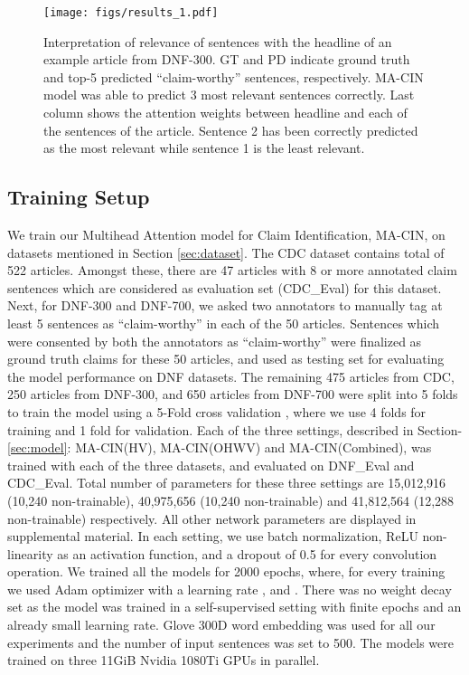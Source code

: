 \documentclass[11pt,a4paper]{article}
\begin{document}
\begin{figure*}[ht]
\begin{center}
\texttt{[image: figs/results\_1.pdf]}
\caption{\label{fig:hd_sent} Interpretation of relevance of sentences with the headline of an example article from DNF-300. GT and PD indicate ground truth and top-5 predicted ``claim-worthy'' sentences, respectively. MA-CIN model was able to predict 3 most relevant sentences correctly. Last column shows the attention weights between headline and each of the sentences of the article. Sentence 2 has been correctly predicted as the most relevant while sentence 1 is the least relevant.}
\end{center}
\end{figure*}

\subsection{Training Setup}
\label{sect:exp_training}
We train our Multihead Attention model for Claim Identification, MA-CIN, on datasets mentioned in Section \ref{sec:dataset}. The CDC dataset contains total of 522 articles. Amongst these, there are 47 articles with 8 or more annotated claim sentences which are considered as evaluation set (CDC\_Eval) for this dataset. Next, for DNF-300 and DNF-700, we asked two annotators to manually tag at least 5 sentences as ``claim-worthy'' in each of the 50 articles. Sentences which were consented by both the annotators as ``claim-worthy'' were finalized as ground truth claims for these 50 articles, and used as testing set for evaluating the model performance on DNF datasets. The remaining 475 articles from CDC, 250 articles from DNF-300, and 650 articles from DNF-700 were split into 5 folds to train the model using a 5-Fold cross validation \cite{Kohavi:1995:SCB:1643031.1643047}, where we use 4 folds for training and 1 fold for validation. Each of the three settings, described in Section- \ref{sec:model}: MA-CIN(HV), MA-CIN(OHWV) and MA-CIN(Combined), was trained with each of the three datasets, and evaluated on DNF\_Eval and CDC\_Eval. Total number of parameters for these three settings are 15,012,916 (10,240 non-trainable), 40,975,656 (10,240 non-trainable) and 41,812,564 (12,288 non-trainable) respectively. All other network parameters are displayed in supplemental material.\newline
\indent In each setting, we use batch normalization, ReLU non-linearity as an activation function, and a dropout of 0.5 for every convolution operation. We trained all the models for 2000 epochs, where, for every training we used Adam optimizer with a learning rate ,  and . There was no weight decay set as the model was trained in a self-supervised setting with finite epochs and an already small learning rate. Glove 300D word embedding was used for all our experiments and the number of input sentences was set to 500. The models were trained on three 11GiB Nvidia 1080Ti GPUs in parallel.
\end{document}
